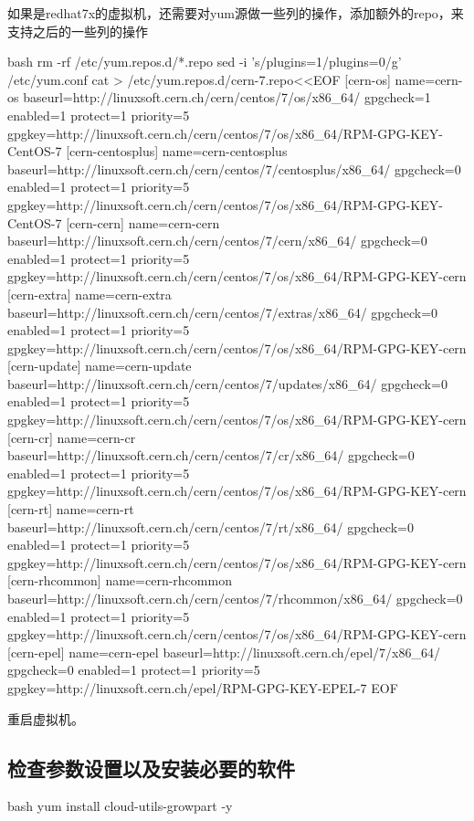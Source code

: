 如果是redhat7x的虚拟机，还需要对yum源做一些列的操作，添加额外的repo，来支持之后的一些列的操作
\begin{code-block}{bash}
rm -rf /etc/yum.repos.d/*.repo
sed -i 's/plugins=1/plugins=0/g' /etc/yum.conf
cat > /etc/yum.repos.d/cern-7.repo<<EOF
[cern-os]
name=cern-os
baseurl=http://linuxsoft.cern.ch/cern/centos/7/os/x86_64/
gpgcheck=1
enabled=1
protect=1
priority=5
gpgkey=http://linuxsoft.cern.ch/cern/centos/7/os/x86_64/RPM-GPG-KEY-CentOS-7
[cern-centosplus]
name=cern-centosplus
baseurl=http://linuxsoft.cern.ch/cern/centos/7/centosplus/x86_64/
gpgcheck=0
enabled=1
protect=1
priority=5
gpgkey=http://linuxsoft.cern.ch/cern/centos/7/os/x86_64/RPM-GPG-KEY-CentOS-7
[cern-cern]
name=cern-cern
baseurl=http://linuxsoft.cern.ch/cern/centos/7/cern/x86_64/
gpgcheck=0
enabled=1
protect=1
priority=5
gpgkey=http://linuxsoft.cern.ch/cern/centos/7/os/x86_64/RPM-GPG-KEY-cern
[cern-extra]
name=cern-extra
baseurl=http://linuxsoft.cern.ch/cern/centos/7/extras/x86_64/
gpgcheck=0
enabled=1
protect=1
priority=5
gpgkey=http://linuxsoft.cern.ch/cern/centos/7/os/x86_64/RPM-GPG-KEY-cern
[cern-update]
name=cern-update
baseurl=http://linuxsoft.cern.ch/cern/centos/7/updates/x86_64/
gpgcheck=0
enabled=1
protect=1
priority=5
gpgkey=http://linuxsoft.cern.ch/cern/centos/7/os/x86_64/RPM-GPG-KEY-cern
[cern-cr]
name=cern-cr
baseurl=http://linuxsoft.cern.ch/cern/centos/7/cr/x86_64/
gpgcheck=0
enabled=1
protect=1
priority=5
gpgkey=http://linuxsoft.cern.ch/cern/centos/7/os/x86_64/RPM-GPG-KEY-cern
[cern-rt]
name=cern-rt
baseurl=http://linuxsoft.cern.ch/cern/centos/7/rt/x86_64/
gpgcheck=0
enabled=1
protect=1
priority=5
gpgkey=http://linuxsoft.cern.ch/cern/centos/7/os/x86_64/RPM-GPG-KEY-cern
[cern-rhcommon]
name=cern-rhcommon
baseurl=http://linuxsoft.cern.ch/cern/centos/7/rhcommon/x86_64/
gpgcheck=0
enabled=1
protect=1
priority=5
gpgkey=http://linuxsoft.cern.ch/cern/centos/7/os/x86_64/RPM-GPG-KEY-cern
[cern-epel]
name=cern-epel
baseurl=http://linuxsoft.cern.ch/epel/7/x86_64/
gpgcheck=0
enabled=1
protect=1
priority=5
gpgkey=http://linuxsoft.cern.ch/epel/RPM-GPG-KEY-EPEL-7
EOF
\end{code-block}

重启虚拟机。

\subsection{检查参数设置以及安装必要的软件}
\begin{code-block}{bash}
yum install cloud-utils-growpart -y
\end{code-block}

